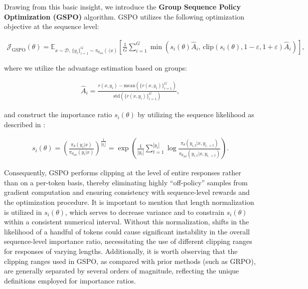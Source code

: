 Drawing from this basic insight, we introduce the \textbf{Group Sequence Policy Optimization (GSPO)} algorithm. GSPO utilizes the following optimization objective at the sequence level:

\begin{align}
\mathcal{J}_\text{GSPO} (\theta) =
\mathbb{E}_{ x \sim \mathcal{D},\, \{y_i\}_{i=1}^G \sim \pi_{\theta_\text{old}}( \cdot | x) }
\left[ 
\frac{1}{G} \sum_{i=1}^{G}
\min \left( s_{i}(\theta)  \widehat{A}_{i},  \, \mathrm{clip} \left( s_{i}(\theta), 1 - {\varepsilon}, 1 + {\varepsilon} \right) \widehat{A}_{i} \right) 
\right],
\label{equ:gspo}
\end{align}

where we utilize the advantage estimation based on groups:

\begin{align}
\widehat{A}_{i} = \frac{r(x, y_i) - \mathrm{mean} \left( \{ r(x, y_i) \}_{i=1}^G \right) }{ \mathrm{std} \left( \{ r(x, y_i) \}_{i=1}^G \right) },
\end{align}

and construct the importance ratio $s_{i}(\theta)$ by utilizing the sequence likelihood as described in \citep{click}:

\begin{align}
s_{i}(\theta) = \left( \frac{ \pi_{\theta} (y_i | x) }{ \pi_{\theta_\text{old}} (y_i | x)} \right)^{\frac{1}{|y_i|}}
=
\exp \left( \frac{1}{|y_i|} \sum_{t=1}^{|y_i|} \log \frac{ \pi_{\theta} (y_{i,t} | x, y_{i,<t}) }{ \pi_{\theta_\text{old}} (y_{i,t} | x,y_{i,<t})} \right).
\end{align}

Consequently, GSPO performs clipping at the level of entire responses rather than on a per-token basis, thereby eliminating highly ``off-policy'' samples from gradient computation and ensuring consistency with sequence-level rewards and the optimization procedure. It is important to mention that length normalization is utilized in $s_{i}(\theta)$, which serves to decrease variance and to constrain $s_{i}(\theta)$ within a consistent numerical interval. Without this normalization, shifts in the likelihood of a handful of tokens could cause significant instability in the overall sequence-level importance ratio, necessitating the use of different clipping ranges for responses of varying lengths. Additionally, it is worth observing that the clipping ranges used in GSPO, as compared with prior methods (such as GRPO), are generally separated by several orders of magnitude, reflecting the unique definitions employed for importance ratios.

